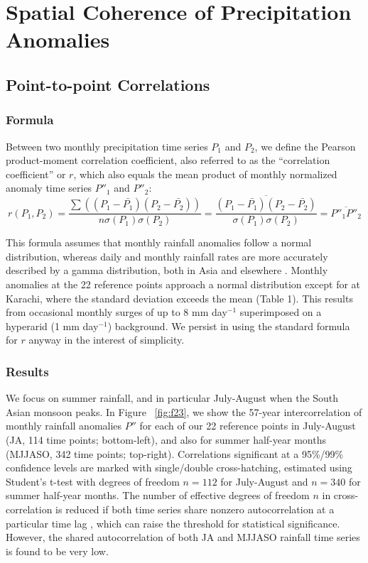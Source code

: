 \section{Spatial Coherence of Precipitation Anomalies}

\subsection{Point-to-point Correlations}

\subsubsection{Formula}

Between two monthly precipitation time series $P_1$ and $P_2$, we define the Pearson product-moment correlation coefficient, also referred to as the ``correlation coefficient'' or $r$, which also equals the mean product of monthly normalized anomaly time series $P''_1$ and $P''_2$:
\begin{displaymath}
	r(P_1,P_2)=\frac{\sum\left(\left(P_1-\bar{P_1}\right)\left(P_2-\bar{P_2}\right)\right)}{n\sigma\left(P_1\right)\sigma\left(P_2\right)}=\frac{\overline{\left(P_1-\bar{P_1}\right)\left(P_2-\bar{P_2}\right)}}{\sigma\left(P_1\right)\sigma\left(P_2\right)}=\overline{P''_1P''_2}
\end{displaymath}

	This formula assumes that monthly rainfall anomalies follow a normal distribution, whereas daily and monthly rainfall rates are more accurately described by a gamma distribution, both in Asia and elsewhere \citep{Mooley1973,Aksoy1999,Husak2007}. Monthly anomalies at the 22 reference points approach a normal distribution except for at Karachi, where the standard deviation exceeds the mean (Table 1). This results from occasional monthly surges of up to 8 mm day$^{-1}$ superimposed on a hyperarid (1 mm day$^{-1}$) background. We persist in using the standard formula for $r$ anyway in the interest of simplicity.

\subsubsection{Results}

	 We focus on summer rainfall, and in particular July-August when the South Asian monsoon peaks. In Figure ~\ref{fig:f23}, we show the 57-year intercorrelation of monthly rainfall anomalies $P''$ for each of our 22 reference points in July-August (JA, 114 time points; bottom-left), and also for summer half-year months (MJJASO, 342 time points; top-right). Correlations significant at a 95\%/99\% confidence levels are marked with single/double cross-hatching, estimated using Student's t-test with degrees of freedom $n=112$ for July-August and $n=340$ for summer half-year months. The number of effective degrees of freedom $n$ in cross-correlation is reduced if both time series share nonzero autocorrelation at a particular time lag \citep{Livezey1983}, which can raise the threshold for statistical significance. However, the shared autocorrelation of both JA and MJJASO rainfall time series is found to be very low.


